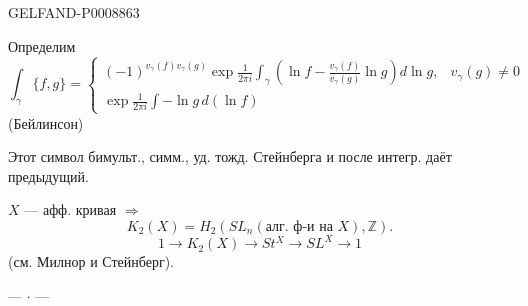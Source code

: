 \begin{GelfandAdjacentEvidence}{GELFAND-P000886}{3}


Определим
\begin{equation*}
\int_\gamma\{f,g\}=
\begin{cases}
(-1)^{v_\gamma(f)v_\gamma(g)}\exp\frac{1}{2\pi i}\int_\gamma
\left(\ln f-\frac{v_\gamma(f)}{v_\gamma(g)}\ln g\right)d\ln g,&v_\gamma(g)\ne0\\[3pt]
\exp\frac{1}{2\pi i}\int-\ln g\,d(\ln f)
\end{cases}
\tag{16}
\end{equation*}
(Бейлинсон)

Этот символ бимульт., симм., уд. тожд. Стейнберга и после интегр. даёт предыдущий.
\end{GelfandAdjacentEvidence}


$X$ --- афф. кривая $\Rightarrow$
\begin{equation*}
K_2(X)=H_2(SL_n(\text{алг. ф-и на }X),\mathbb Z).
\tag{17}
\end{equation*}
\begin{equation*}
1\to K_2(X)\to St^X\to SL^X\to1
\tag{18}
\end{equation*}
(см. Милнор и Стейнберг).

\begin{center}
--- $\cdot$ ---
\end{center}


